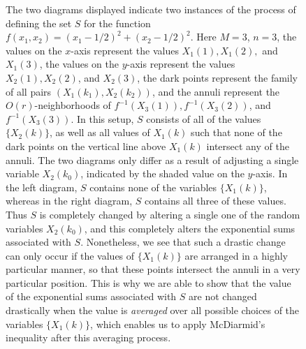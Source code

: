\documentclass[dvipsnames,letterpaper,12pt]{article}
\numberwithin{equation}{section}
\numberwithin{theorem}{section}
\begin{document}
\begin{figure}
\begin{center}




\caption[LoF entry]{The two diagrams displayed indicate two instances of the process of defining the set $S$ for the function $f(x_1,x_2) = (x_1 - 1/2)^2 + (x_2 - 1/2)^2$. Here $M = 3$, $n = 3$, the values on the $x$-axis represent the values $X_1(1), X_1(2),$ and $X_1(3)$, the values on the $y$-axis represent the values $X_2(1), X_2(2)$, and $X_2(3)$, the dark points represent the family of all pairs $(X_1(k_1),X_2(k_2))$, and the annuli represent the $O(r)$-neighborhoods of $f^{-1}(X_3(1)), f^{-1}(X_3(2))$, and $f^{-1}(X_3(3))$. In this setup, $S$ consists of all of the values $\{ X_2(k) \}$, as well as all values of $X_1(k)$ such that none of the dark points on the vertical line above $X_1(k)$ intersect any of the annuli. The two diagrams only differ as a result of adjusting a single variable $X_2(k_0)$, indicated by the shaded value on the $y$-axis. In the left diagram, $S$ contains none of the variables $\{ X_1(k) \}$, whereas in the right diagram, $S$ contains all three of these values. Thus $S$ is completely changed by altering a single one of the random variables $X_2(k_0)$, and this completely alters the exponential sums associated with $S$. Nonetheless, we see that such a drastic change can only occur if the values of $\{ X_1(k) \}$ are arranged in a highly particular manner, so that these points intersect the annuli in a very particular position. This is why we are able to show that the value of the exponential sums associated with $S$ are not changed drastically when the value is \emph{averaged} over all possible choices of the variables $\{ X_1(k) \}$, which enables us to apply McDiarmid's inequality after this averaging process.}
\label{thefigure}
\end{center}
\end{figure}
\end{document}
